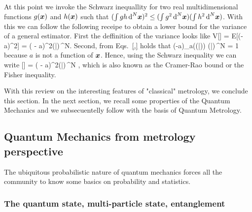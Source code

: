 At this point we invoke the Schwarz inequallity for two real multidimensional functions $g(\boldsymbol{x})$ and $h(\boldsymbol{x})$ such that $(\int g h \,\text{d}^N\boldsymbol{x})^2\leq (\int g^2 \,\text{d}^N\boldsymbol{x}) (\int h^2 \,\text{d}^N\boldsymbol{x})$.
With this we can follow the following receipe to obtain a lower bound for the variance of a general estimator.
First the deffinition of the variance looks like
\be
  V[] = E[(-a)^2] = \int ( - a)^2\prob(|)\,^N.
\ee
Second, from Eqs.~\eqref{,} holds that
\be
  \int (-a)\partial_a\big(\ln  \prob(|)\big) \prob(|)\,^N = 1
\ee
because $a$ is not a function of $\boldsymbol{x}$.
Hence, using the Schwarz inequality we can write
\be
  [] = \int ( - a)^2\prob(|)\,^N \geq {},
\ee
which is also known as the Cramer-Rao bound or the Fisher inequality.

With this review on the interesting features of "classical" metrology, we conclude this section.
In the next section, we recall some properties of the Quantum Mechanics and we subsecuentelly follow with the basis of Quantum Metrology. 




\subsection{Quantum Mechanics from metrology perspective}

The ubiquitous probabilistic nature of quantum mechanics forces all the community to know some basics on probability and statistics.

\subsubsection{The quantum state, multi-particle state, entanglement}

